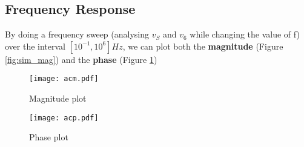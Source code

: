 \subsection{Frequency Response}
\hspace{12pt} By doing a frequency sweep (analysing $v_S$ and $v_6$ while changing the value of f) over the interval $[10^{-1}, 10^6] Hz$, we can plot both the \textbf{magnitude} (Figure \ref{fig:sim_mag}) and the \textbf{phase} (Figure \ref{fig:sim_ph})

\begin{figure}
	\begin{minipage}{.45\textwidth}
		\centering
		\texttt{[image: acm.pdf]}
		\caption{Magnitude plot}
		\label{fig:sim_mag}
	\end{minipage}
	\begin{minipage}{.45\textwidth}
		\centering
		\texttt{[image: acp.pdf]}
		\caption{Phase plot}
		\label{fig:sim_ph}
	\end{minipage}
\end{figure}




